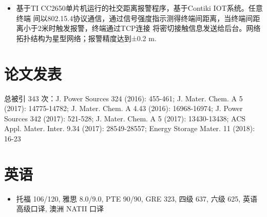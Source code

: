 \documentclass{resume}
\begin{document}
\begin{itemize}
  \item 基于TI CC2650单片机运行的社交距离报警程序，基于Contiki IOT系统。任意终端
  间以802.15.4协议通信，通过信号强度指示测得终端间距离，当终端间距离小于2米时触发报警，终端通过TCP连接
  将密切接触信息发送给后台。网络拓扑结构为星型网络；报警精度达到±0.2 m.
\end{itemize}


\section{论文发表}
 总被引 343 次：J. Power Sources 324 (2016): 455-461; J. Mater. Chem. A 5 (2017): 14775-14782; J. Mater. Chem. A 4.43
  (2016): 16968-16974; J. Power Sources 342 (2017): 521-528; J. Mater. Chem. A 5 (2017): 13430-13438; ACS
  Appl. Mater. Inter. 9.34 (2017): 28549-28557; Energy Storage Mater. 11 (2018): 16-23

\section{英语}
\begin{itemize}
  \item 托福 106/120, 雅思 8.0/9.0, PTE 90/90, GRE 323, 四级 637, 六级 625, 英语高级口译, 澳洲 NATII 口译
\end{itemize}


\end{document}
